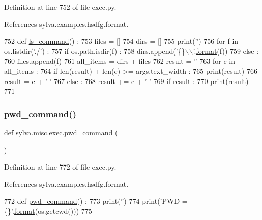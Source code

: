 Definition at line 752 of file exec.\+py.



References sylva.\+examples.\+hsdfg.\+format.


\begin{DoxyCode}
752 \textcolor{keyword}{def }\hyperlink{namespacesylva_1_1misc_1_1exec_a2a286b4556ac1dcfb9fa47e672f7bee0}{ls\_command}() :
753   files = []
754   dirs = []
755   print(\textcolor{stringliteral}{''})
756   \textcolor{keywordflow}{for} f \textcolor{keywordflow}{in} os.listdir(\textcolor{stringliteral}{'./'}) :
757     \textcolor{keywordflow}{if} os.path.isdir(f) :
758       dirs.append(\textcolor{stringliteral}{'\{\}\(\backslash\)\(\backslash\)'}.\hyperlink{namespacesylva_1_1examples_1_1hsdfg_ab3510a0b8457362330aa4d9fd2209590}{format}(f))
759     \textcolor{keywordflow}{else} :
760       files.append(f)
761   all\_items = dirs + files
762   result = \textcolor{stringliteral}{''}
763   \textcolor{keywordflow}{for} c \textcolor{keywordflow}{in} all\_items :
764     \textcolor{keywordflow}{if} len(result) + len(c) >= args.text\_width :
765       print(result)
766       result = c + \textcolor{stringliteral}{' '}
767     \textcolor{keywordflow}{else} :
768       result += c + \textcolor{stringliteral}{' '}
769   \textcolor{keywordflow}{if} result :
770     print(result)
771 
\end{DoxyCode}
\mbox{\label{namespacesylva_1_1misc_1_1exec_a2ac5cdf0face6797b9b5f2b60e7095e7}} 
\subsubsection{\texorpdfstring{pwd\+\_\+command()}{pwd\_command()}}
{\footnotesize\ttfamily def sylva.\+misc.\+exec.\+pwd\+\_\+command (\begin{DoxyParamCaption}{ }\end{DoxyParamCaption})}



Definition at line 772 of file exec.\+py.



References sylva.\+examples.\+hsdfg.\+format.


\begin{DoxyCode}
772 \textcolor{keyword}{def }\hyperlink{namespacesylva_1_1misc_1_1exec_a2ac5cdf0face6797b9b5f2b60e7095e7}{pwd\_command}() :
773   print(\textcolor{stringliteral}{''})
774   print(\textcolor{stringliteral}{'PWD = \{\}'}.\hyperlink{namespacesylva_1_1examples_1_1hsdfg_ab3510a0b8457362330aa4d9fd2209590}{format}(os.getcwd()))
775 
\end{DoxyCode}
\mbox{\label{namespacesylva_1_1misc_1_1exec_a670ec00a77a111ff274f7d3dc3989966}} 
